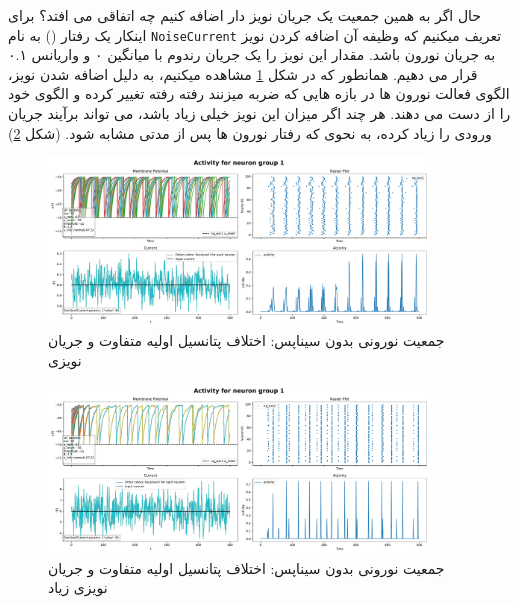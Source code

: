 \documentclass{report}
\begin{document}
        حال اگر به همین جمعیت یک جریان نویز دار اضافه کنیم چه اتفاقی می افتد؟ برای اینکار یک رفتار
        ()
        به نام 
        \texttt{NoiseCurrent}
        تعریف میکنیم که وظیفه آن اضافه کردن نویز به جریان نورون باشد. مقدار این نویز را یک جریان رندوم با میانگین ۰ و واریانس ۰.۱ قرار می دهیم. همانطور که در شکل 
        \ref{fig:part1-simple-ng-u-init-noise-curr}
        مشاهده میکنیم، به دلیل اضافه شدن نویز، الگوی فعالت نورون ها در بازه هایی که ضربه میزنند رفته رفته تغییر کرده و الگوی خود را از دست می دهند. هر چند اگر میزان این نویز خیلی زیاد باشد، می تواند برآیند جریان ورودی را زیاد کرده، به نحوی که رفتار نورون ها پس از مدتی مشابه شود.
        (شکل \ref{fig:part1-simple-ng-u-init-high-noise-curr})
        \begin{figure}[!ht]
            \centering
            \includegraphics[width=0.9\textwidth]{plots/part1-Simple-ng-without-synapse-noise-curr.pdf} 
            \caption{جمعیت نورونی بدون سیناپس: اختلاف پتانسیل اولیه متفاوت و جریان نویزی}
            \label{fig:part1-simple-ng-u-init-noise-curr}
        \end{figure}
        \begin{figure}[!ht]
            \centering
            \includegraphics[width=0.9\textwidth]{plots/part1-Simple-ng-without-synapse-high-noise-curr.pdf} 
            \caption{جمعیت نورونی بدون سیناپس: اختلاف پتانسیل اولیه متفاوت و جریان نویزی زیاد}
            \label{fig:part1-simple-ng-u-init-high-noise-curr}
        \end{figure}
\end{document}

